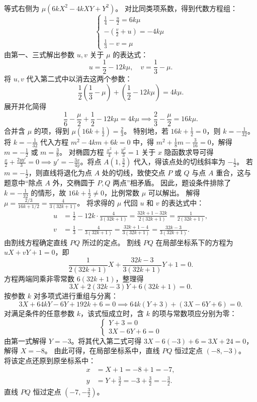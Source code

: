 \begin{solution}
\begin{align*}
\end{align*}
等式右侧为 $\mu(6kX^2 - 4kXY + Y^2)$。
对比同类项系数，得到代数方程组：
\[ \begin{cases} \frac{1}{4} - \frac{u}{2} = 6k\mu \\ -\left(\frac{v}{2} + u\right) = -4k\mu \\ \frac{1}{3} - v = \mu \end{cases} \]
由第一、三式解出参数 $u, v$ 关于 $\mu$ 的表达式：
\[ u = \frac{1}{2} - 12k\mu, \quad v = \frac{1}{3} - \mu. \]
将 $u, v$ 代入第二式中以消去这两个参数：
\[ \frac{1}{2}\left(\frac{1}{3} - \mu\right) + \left(\frac{1}{2} - 12k\mu\right) = 4k\mu. \]
展开并化简得
\[ \frac{1}{6} - \frac{\mu}{2} + \frac{1}{2} - 12k\mu = 4k\mu \implies \frac{2}{3} - \frac{\mu}{2} = 16k\mu. \]
合并含 $\mu$ 的项，得到 $\mu\left(16k + \frac{1}{2}\right) = \frac{2}{3}$。
特别地，若 $16k + \frac{1}{2} = 0$，则 $k = -\frac{1}{32}$。
将 $k = -\frac{1}{32}$ 代入方程 $m^2 - 4km + 6k = 0$ 中，得 $m^2 + \frac{1}{8}m - \frac{3}{16} = 0$，解得 $m = -\frac{1}{2}$ 或 $m = \frac{3}{8}$。
对椭圆方程 $\frac{x^2}{4} + \frac{y^2}{3} = 1$ 关于 $x$ 隐函数求导可得 $\frac{x}{2} + \frac{2yy'}{3} = 0 \implies y' = -\frac{3x}{4y}$。将点 $A\left(1, \frac{3}{2}\right)$ 代入，得该点处的切线斜率为 $-\frac{1}{2}$。
若 $m = -\frac{1}{2}$，则直线将退化为点 $A$ 处的切线，致使交点 $P$ 或 $Q$ 与点 $A$ 重合，这与题意中“除点 $A$ 外，交椭圆于 $P, Q$ 两点”相矛盾。
因此，题设条件排除了 $k = -\frac{1}{32}$ 的情形，故 $16k + \frac{1}{2} \neq 0$，比例常数 $\mu$ 可以解出。
解得 $\mu = \frac{2/3}{16k + 1/2} = \frac{4}{3(32k + 1)}$。
将求得的 $\mu$ 代回 $u$ 和 $v$ 的表达式中：
\begin{align*}
u &= \frac{1}{2} - 12k \cdot \frac{4}{3(32k + 1)} = \frac{32k + 1 - 32k}{2(32k + 1)} = \frac{1}{2(32k + 1)}, \\
v &= \frac{1}{3} - \frac{4}{3(32k + 1)} = \frac{32k + 1 - 4}{3(32k + 1)} = \frac{32k - 3}{3(32k + 1)}.
\end{align*}
由割线方程确定直线 $PQ$ 所过的定点。
割线 $PQ$ 在局部坐标系下的方程为 $uX + vY + 1 = 0$，即
\[ \frac{1}{2(32k + 1)}X + \frac{32k - 3}{3(32k + 1)}Y + 1 = 0. \]
方程两端同乘非零常数 $6(32k + 1)$，整理得
\[ 3X + 2(32k - 3)Y + 6(32k + 1) = 0. \]
按参数 $k$ 对多项式进行重组与分离：
\[ 3X + 64kY - 6Y + 192k + 6 = 0 \implies 64k(Y + 3) + (3X - 6Y + 6) = 0. \]
对满足条件的任意参数 $k$，该式恒成立时，含 $k$ 的项与常数项应分别为零：
\[ \begin{cases} Y + 3 = 0 \\ 3X - 6Y + 6 = 0 \end{cases} \]
由第一式解得 $Y = -3$。将其代入第二式可得 $3X - 6(-3) + 6 = 3X + 24 = 0$，解得 $X = -8$。
由此可得，在局部坐标系中，直线 $PQ$ 恒过定点 $(-8, -3)$。\\
将该定点还原到原坐标系中：
\begin{align*}
x &= X + 1 = -8 + 1 = -7, \\
y &= Y + \frac{3}{2} = -3 + \frac{3}{2} = -\frac{3}{2}.
\end{align*}
直线 $PQ$ 恒过定点 $\left(-7, -\frac{3}{2}\right)$。
\end{solution}



